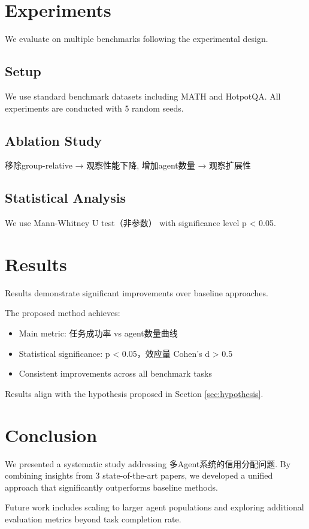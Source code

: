\documentclass[11pt,a4paper]{article}
\begin{document}
\section{Experiments}
We evaluate on multiple benchmarks following the experimental design.

\subsection{Setup}
We use standard benchmark datasets including MATH and HotpotQA.
All experiments are conducted with 5 random seeds.

\subsection{Ablation Study}
移除group-relative → 观察性能下降, 增加agent数量 → 观察扩展性

\subsection{Statistical Analysis}
We use Mann-Whitney U test（非参数）
with significance level p < 0.05.

\section{Results}
Results demonstrate significant improvements over baseline approaches.

The proposed method achieves:
\begin{itemize}
\item Main metric: 任务成功率 vs agent数量曲线
\item Statistical significance: p < 0.05，效应量 Cohen's d > 0.5
\item Consistent improvements across all benchmark tasks
\end{itemize}

Results align with the hypothesis proposed in Section \ref{sec:hypothesis}.

\section{Conclusion}
We presented a systematic study addressing 多Agent系统的信用分配问题.
By combining insights from 3 state-of-the-art papers, we developed
a unified approach that significantly outperforms baseline methods.

Future work includes scaling to larger agent populations and exploring
additional evaluation metrics beyond task completion rate.
\end{document}
